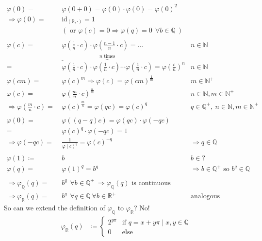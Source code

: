 \documentclass[12pt, a4paper]{article}
\begin{document}
\begin{align*}
\varphi(0) =&~ \varphi(0+0) = \varphi(0) \cdot \varphi(0) = \varphi(0)^2 \\
\Longrightarrow \varphi(0) =&~ \text{id}_{(\mathbb{R}, \cdot)} = 1\\
&~(\text{ or } \varphi(c) = 0 \Longrightarrow \varphi(q) = 0 ~~\forall b\in\mathbb{Q}~)\\~\\
\varphi(c) =&~ \varphi\left({\frac{1}{n}\cdot c}\right) \cdot \varphi\left({\frac{n-1}{n}\cdot c}\right) = \dots & n\in \mathbb{N} \\
=&~\overbrace{\varphi\left({\frac{1}{n}\cdot c}\right) \cdot \varphi\left({\frac{1}{n}\cdot c}\right)\cdots \varphi\left({\frac{1}{n}\cdot c}\right)}^{n \text{ times}} = \varphi\left({\frac{c}{n}}\right)^n & n\in \mathbb{N}\\
\varphi(cm) =&~ \varphi\left({c}\right)^m \Longrightarrow \varphi(c) = \varphi\left({cm}\right)^\frac{1}{m} & m\in \mathbb{N}^+\\
\varphi\left(c\right) =&~ \varphi\left({\frac{m}{n}\cdot c}\right)^\frac{n}{m} & n\in \mathbb{N},m\in \mathbb{N}^+\\
\Longrightarrow \varphi\left(\frac{m}{n}\cdot c\right) =&~ \varphi\left({c}\right)^\frac{m}{n} = \varphi\left(q c\right) = \varphi\left({c}\right)^q & q\in \mathbb{Q}^+,~ n\in \mathbb{N},m\in \mathbb{N}^+\\~\\
\varphi(0) =&~ \varphi((q-q)c) = \varphi(qc) \cdot \varphi(-qc)\\
 =&~ \varphi(c)^q \cdot \varphi(-qc) = 1 \\
\Longrightarrow \varphi(-qc) =&~ \frac{1}{ \varphi(c)^q} =  \varphi(c)^{-q} & \Longrightarrow q\in \mathbb{Q}\\~\\
\varphi(1) \coloneqq&~ b & b \in \mathbb{?}\\
\varphi(q) =&~ \varphi(1)^q = b^q & \Longrightarrow b \in \mathbb{Q}^+ \text{ so } b^q \in \mathbb{Q} \\~\\
\Longrightarrow \varphi_\mathbb{Q}(q) =&~ b^q ~~\forall b\in\mathbb{Q}^+ ~\Longrightarrow  \varphi_\mathbb{Q}(q) \text{ is}\text{ continuous}\\
\Longrightarrow \varphi_\mathbb{R}(q) =&~ b^q ~~\forall q\in\mathbb{Q}~\forall b\in\mathbb{R}^+ & \text{analogous}
\end{align*}
So can we extend the definition of $\varphi_\mathbb{Q}$ to $\varphi_\mathbb{R}$? No!
\begin{align*}
\varphi_\mathbb{R}(q) &\coloneqq \left\{\begin{array}{rl}2^{y\pi}	 & \text{if } q = x + y\pi \mid x,y\in\mathbb{Q}\\ 0& \text{else}\end{array}\right.
\end{align*}
\end{document}
